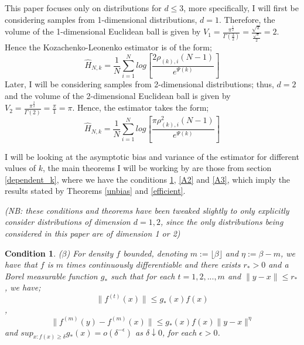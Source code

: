 \documentclass{report}
\newtheorem{remark}{Condition}
\begin{document}
This paper focuses only on distributions for $d \leq 3$, more specifically, I will first be considering samples from 1-dimensional distributions, $d=1$. Therefore, the volume of the 1-dimensional Euclidean ball is given by $V_{1} = \frac{\pi^{\frac{1}{2}}}{\Gamma (\frac{3}{2})} = \frac{\sqrt{\pi}}{\frac{\sqrt{\pi}}{2}} = 2$. Hence the Kozachenko-Leonenko estimator is of the form;
\begin{equation} \label{KLest_d=1}
\hat{H}_{N, k} = \frac{1}{N} \sum_{i=1}^{N} log \left[ \frac{2\rho_{(k),i}(N-1)}{e^{\Psi(k)}} \right]
\end{equation}
 Later, I will be considering samples from 2-dimensional distributions; thus, $d=2$ and the volume of the 2-dimensional Euclidean ball is given by $V_{2} = \frac{\pi^{\frac{2}{2}}}{\Gamma (2)} = \frac{\pi}{1} = \pi$. Hence, the estimator takes the form;
\begin{equation} \label{KLest_d=2}
\hat{H}_{N, k} = \frac{1}{N} \sum_{i=1}^{N} log \left[ \frac{\pi \rho_{(k),i}^{2} (N-1)}{e^{\Psi(k)}} \right]
\end{equation} 

I will be looking at the asymptotic bias and variance of the estimator for different values of $k$, the main theorems I will be working by are those from section \ref{dependent_k}, where we have the conditions \ref{A1}, \ref{A2} and \ref{A3}, which imply the results stated by Theorems \ref{unbias} and \ref{efficient}. 

\textit{(NB: these conditions and theorems have been tweaked slightly to only explicitly consider distributions of dimension $d=1, 2$, since the only distributions being considered in this paper are of dimension 1 or 2)}

\begin{remark} ($\beta$) \label{A1}
For density $f$ bounded, denoting $m := \lfloor \beta \rfloor$ and $\eta := \beta -m$, we have that $f$ is $m$ times continuously differentiable and there exists $r_{*} > 0$ and a Borel measurable function $g_{*}$ such that for each $t = 1, 2, ... , m$ and $\|y-x\| \leq r_{*}$, we have;
\begin{equation}
\| f^{(t)} (x) \| \leq g_{*}(x)f(x) \nonumber
\end{equation},
\begin{equation}
\| f^{(m)} (y) - f^{(m)} (x) \| \leq g_{*}(x)f(x) \|y-x\|^{\eta} \nonumber
\end{equation}
and $sup_{x:f(x)\geq \delta} g_{*}(x) = o(\delta^{-\epsilon})$ as $\delta \downarrow 0$, for each $\epsilon > 0$.
\end{remark}
\end{document}
